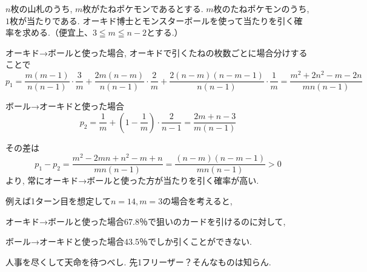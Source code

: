 \documentclass[a4paper,12pt]{jsarticle}
\begin{document}
$n$枚の山札のうち, $m$枚がたねポケモンであるとする. $m$枚のたねポケモンのうち, $1$枚が当たりである.
オーキド博士とモンスターボールを使って当たりを引く確率を求める.（便宜上、$3 \leqq m \leqq n-2$とする.）

オーキド→ボールと使った場合, オーキドで引くたねの枚数ごとに場合分けすることで
\begin{equation*}
    p_1 = \frac{m(m-1)}{n(n-1)} \cdot \frac{3}{m}
    + \frac{2m(n-m)}{n(n-1)} \cdot \frac{2}{m}
    + \frac{2(n-m)(n-m-1)}{n(n-1)} \cdot \frac{1}{m}
    = \frac{m^2+2n^2-m-2n}{mn(n-1)}
\end{equation*}

ボール→オーキドと使った場合
\begin{equation*}
    p_2 = \frac{1}{m} + \left(1-\frac{1}{m}\right) \cdot \frac{2}{n-1} = \frac{2m+n-3}{m(n-1)}
\end{equation*}

その差は
\begin{equation*}
    p_1 - p_2 = \frac{m^2-2mn+n^2-m+n}{mn(n-1)} = \frac{(n-m)(n-m-1)}{mn(n-1)} > 0
\end{equation*}
より, 常にオーキド→ボールと使った方が当たりを引く確率が高い.

例えば1ターン目を想定して$n=14, m=3$の場合を考えると,

オーキド→ボールと使った場合67.8％で狙いのカードを引けるのに対して,

ボール→オーキドと使った場合43.5％でしか引くことができない.

人事を尽くして天命を待つべし. 先1フリーザー？そんなものは知らん.
\end{document}
